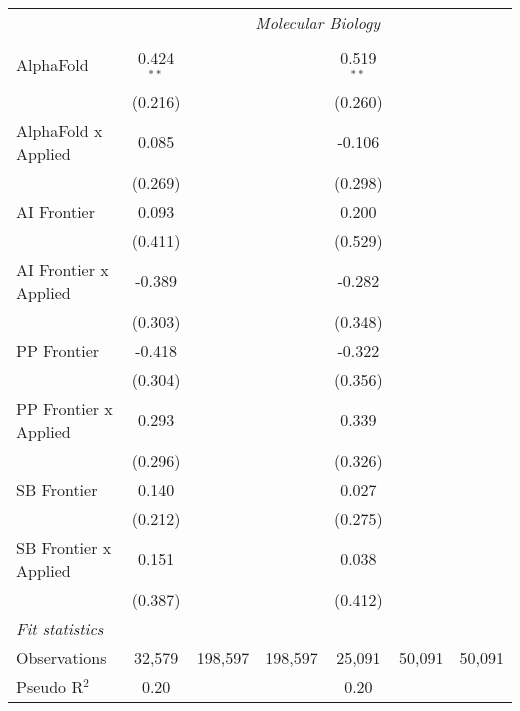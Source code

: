 \begin{tabular}{lcccccc}
 & \multicolumn{6}{c}{\textit{Molecular Biology}} \\ \\
   AlphaFold             & 0.424$^{**}$ &         &         & 0.519$^{**}$ &        &   \\   
                         & (0.216)      &         &         & (0.260)      &        &   \\   
   AlphaFold x Applied   & 0.085        &         &         & -0.106       &        &   \\   
                         & (0.269)      &         &         & (0.298)      &        &   \\   
   AI Frontier           & 0.093        &         &         & 0.200        &        &   \\   
                         & (0.411)      &         &         & (0.529)      &        &   \\   
   AI Frontier x Applied & -0.389       &         &         & -0.282       &        &   \\   
                         & (0.303)      &         &         & (0.348)      &        &   \\   
   PP Frontier           & -0.418       &         &         & -0.322       &        &   \\   
                         & (0.304)      &         &         & (0.356)      &        &   \\   
   PP Frontier x Applied & 0.293        &         &         & 0.339        &        &   \\   
                         & (0.296)      &         &         & (0.326)      &        &   \\   
   SB Frontier           & 0.140        &         &         & 0.027        &        &   \\   
                         & (0.212)      &         &         & (0.275)      &        &   \\   
   SB Frontier x Applied & 0.151        &         &         & 0.038        &        &   \\   
                         & (0.387)      &         &         & (0.412)      &        &   \\   
   \midrule
   \emph{Fit statistics}\\
   Observations          & 32,579       & 198,597 & 198,597 & 25,091       & 50,091 & 50,091\\  
   Pseudo R$^2$          & 0.20         &         &         & 0.20         &        & \\  
   

\end{tabular}
